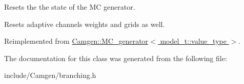 Resets the the state of the M\-C generator. 

Resets adaptive channels weights and grids as well. 

Reimplemented from \hyperlink{a00362_a96247247800b9db50ddf7fafb28aca42}{Camgen\-::\-M\-C\-\_\-generator$<$ model\-\_\-t\-::value\-\_\-type $>$}.



The documentation for this class was generated from the following file\-:\begin{DoxyCompactItemize}
\item 
include/\-Camgen/branching.\-h\end{DoxyCompactItemize}

